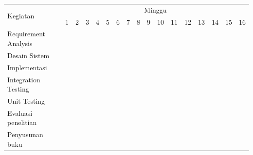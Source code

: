 \newcommand{\w}{}
\newcommand{\G}{\cellcolor{gray}}
\begin{table}[h!]
  \label{tbl:timeline}
  \begin{tabular}{|p{3.5cm}|c|c|c|c|c|c|c|c|c|c|c|c|c|c|c|c|}

    \hline
    \multirow{2}{*}{Kegiatan} & \multicolumn{16}{|c|}{Minggu}                                                                       \\
    \cline{2-17}              &
    1                         & 2                             & 3  & 4  & 5  & 6  & 7  & 8  & 9  & 10 & 11 & 12 & 13 & 14 & 15 & 16 \\
    \hline

    Requirement Analysis      &
    \G                        & \G                            & \w & \w & \w & \w & \w & \w & \w & \w & \w & \w & \w & \w & \w & \w \\
    \hline

    Desain Sistem             &
    \w                        & \w                            & \G & \G & \w & \w & \w & \w & \w & \w & \w & \w & \w & \w & \w & \w \\
    \hline

    Implementasi              &
    \w                        & \w                            & \w & \G & \G & \G & \G & \G & \w & \w & \w & \w & \w & \w & \w & \w \\
    \hline

    Integration Testing       &
    \w                        & \w                            & \w & \w & \w & \w & \w & \w & \G & \G & \w & \w & \w & \w & \w & \w \\
    \hline

    Unit Testing              &
    \w                        & \w                            & \w & \w & \w & \w & \w & \w & \w & \w & \G & \G & \w & \w & \w & \w \\
    \hline

    Evaluasi penelitian       &
    \w                        & \w                            & \w & \w & \w & \w & \w & \w & \w & \w & \w & \w & \G & \G & \G & \G \\
    \hline

    Penyusunan buku           &
    \w                        & \w                            & \w & \w & \w & \w & \G & \G & \G & \G & \G & \G & \G & \G & \G & \G \\
    \hline
  \end{tabular}
\end{table}
